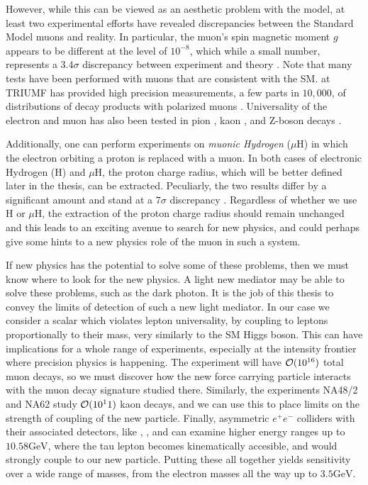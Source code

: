 However, while this can be viewed as an aesthetic problem with the model, at least two experimental efforts have revealed discrepancies between the Standard Model muons and reality.
In particular, the muon's spin magnetic moment $g$ appears to be different at the level of $10^{-8}$, which while a small number, represents a $3.4\sigma$ discrepancy between experiment and theory \cite{2007PhLB..649..173H}.
Note that many tests have been performed with muons that are consistent with the SM.
\twist at TRIUMF has provided high precision measurements, a few parts in $10,000$, of distributions of decay products with polarized muons \cite{Bayes:2011zza}.
Universality of the electron and muon has also been tested in pion \cite{Czapek:1993kc}, kaon \cite{Antonelli:2008jg}, and Z-boson decays \cite{Alexander:1991qw}.

Additionally, one can perform experiments on \emph{muonic Hydrogen} ($\mu\textrm{H}$) in which the electron orbiting a proton is replaced with a muon.
In both cases of electronic Hydrogen (H) and $\mu\textrm{H}$, the proton charge radius, which will be better defined later in the thesis, can be extracted.
Peculiarly, the two results differ by a significant amount  and stand at a $7\sigma$ discrepancy \cite{Carlson:2015jba}.
Regardless of whether we use H or $\mu\textrm{H}$, the extraction of the proton charge radius should remain unchanged and this leads to an exciting avenue to search for new physics, and could perhaps give some hints to a new physics role of the muon in such a system.

If new physics has the potential to solve some of these problems, then we must know where to look for the new physics.
A light new mediator may be able to solve these problems, such as the dark photon.
It is the job of this thesis to convey the limits of detection of such a new light mediator.
In our case we consider a scalar which violates lepton universality, by coupling to leptons proportionally to their mass, very similarly to the SM Higgs boson.
This can have implications for a whole range of experiments, especially at the intensity frontier where precision physics is happening.
The experiment \mueee will have $\operatorname{\mathcal{O}}(10^{16})$ total muon decays, so we must discover how the new force carrying particle interacts with the muon decay signature studied there.
Similarly, the experiments NA48/2 and NA62 study $\operatorname{\mathcal{O}}(10^11)$ kaon decays, and we can use this to place limits on the strength of coupling of the new particle.
Finally, asymmetric $e^+ e^-$ colliders with their associated detectors, like \babar, \belle, and \belletwo can examine higher energy ranges up to $10.58\textrm{GeV}$, where the tau lepton becomes kinematically accesible, and would strongly couple to our new particle.
Putting these all together yields sensitivity over a wide range of masses, from the electron masses all the way up to $3.5\textrm{GeV}$.

